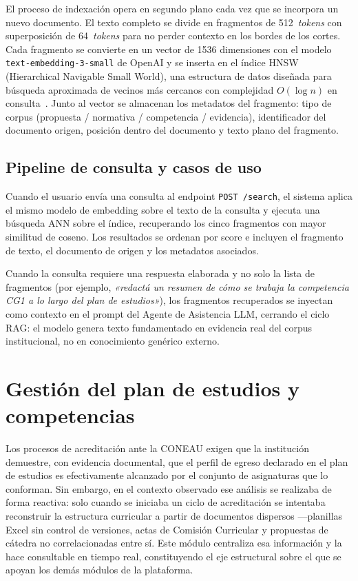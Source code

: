 El proceso de indexación opera en segundo plano cada vez que se incorpora
un nuevo documento.
El texto completo se divide en fragmentos de 512~\emph{tokens} con
superposición de 64~\emph{tokens} para no perder contexto en los bordes
de los cortes.
Cada fragmento se convierte en un vector de 1536 dimensiones con el modelo
\texttt{text-embedding-3-small} de OpenAI y se inserta en el índice
HNSW (Hierarchical Navigable Small World), una estructura de datos diseñada
para búsqueda aproximada de vecinos más cercanos con complejidad
$O(\log n)$ en consulta~\cite{malkov2018efficient}.
Junto al vector se almacenan los metadatos del fragmento: tipo de corpus
(propuesta / normativa / competencia / evidencia), identificador del
documento origen, posición dentro del documento y texto plano del fragmento.

\subsection{Pipeline de consulta y casos de uso}
\label{subsec:rag_consulta}

Cuando el usuario envía una consulta al endpoint \texttt{POST /search},
el sistema aplica el mismo modelo de embedding sobre el texto de la
consulta y ejecuta una búsqueda ANN sobre el índice, recuperando los
cinco fragmentos con mayor similitud de coseno.
Los resultados se ordenan por score e incluyen el fragmento de texto,
el documento de origen y los metadatos asociados.


Cuando la consulta requiere una respuesta elaborada y no solo la lista de
fragmentos (por ejemplo, \textit{«redactá un resumen de cómo se trabaja la
competencia CG1 a lo largo del plan de estudios»}), los fragmentos
recuperados se inyectan como contexto en el prompt del Agente de Asistencia
LLM, cerrando el ciclo RAG: el modelo genera texto fundamentado en evidencia
real del corpus institucional, no en conocimiento genérico externo.

\section{Gestión del plan de estudios y competencias}
\label{sec:plan_estudios}

Los procesos de acreditación ante la CONEAU exigen que la institución
demuestre, con evidencia documental, que el perfil de egreso declarado
en el plan de estudios es efectivamente alcanzado por el conjunto de
asignaturas que lo conforman.
Sin embargo, en el contexto observado ese análisis se realizaba de forma
reactiva: solo cuando se iniciaba un ciclo de acreditación se intentaba
reconstruir la estructura curricular a partir de documentos dispersos
—planillas Excel sin control de versiones, actas de Comisión Curricular
y propuestas de cátedra no correlacionadas entre sí.
Este módulo centraliza esa información y la hace consultable en tiempo
real, constituyendo el eje estructural sobre el que se apoyan los demás
módulos de la plataforma.

